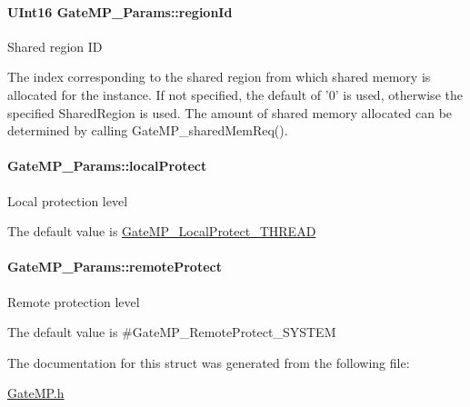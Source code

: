 \paragraph[{region\-Id}]{\setlength{\rightskip}{0pt plus 5cm}U\-Int16 Gate\-M\-P\-\_\-\-Params\-::region\-Id}\label{struct_gate_m_p___params_a5af9a96f1fcf6f29b69c07207a33d453}
Shared region I\-D \begin{DoxyVerb}   The index corresponding to the shared region from which shared memory
   is allocated for the instance.  If not specified, the default of '0'
   is used, otherwise the specified SharedRegion is used.  The amount
   of shared memory allocated can be determined by calling
   GateMP_sharedMemReq().\end{DoxyVerb}
\paragraph[{local\-Protect}]{ Gate\-M\-P\-\_\-\-Params\-::local\-Protect}\label{struct_gate_m_p___params_ac080433fff177b3d5b1cd5dcafc9e28c}
Local protection level

The default value is \hyperlink{_gate_m_p_8h_a3877bd64627d7449d3687e8b06939652a257bc8d4b8d6d19bdbe96cae37cbd908}{Gate\-M\-P\-\_\-\-Local\-Protect\-\_\-\-T\-H\-R\-E\-A\-D} 
\paragraph[{remote\-Protect}]{ Gate\-M\-P\-\_\-\-Params\-::remote\-Protect}\label{struct_gate_m_p___params_a32a1870109d6aa6f583932aff19ebb50}
Remote protection level \begin{DoxyVerb}    The default value is #GateMP_RemoteProtect_SYSTEM\end{DoxyVerb}
 

The documentation for this struct was generated from the following file\-:\begin{DoxyCompactItemize}
\item 
\hyperlink{_gate_m_p_8h}{Gate\-M\-P.\-h}\end{DoxyCompactItemize}
